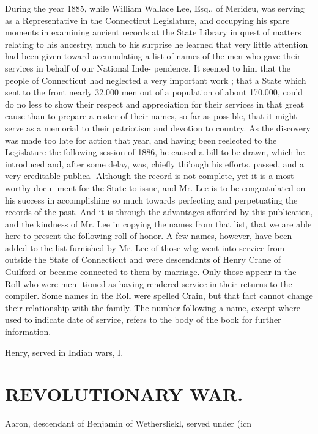 \documentclass[oneside]{book}
\begin{document}
During the year 1885, while William Wallace Lee, Esq., of 
Merideu, was serving as a Representative in the Connecticut 
Legislature, and occupying his spare moments in examining 
ancient records at the State Library in quest of matters relating 
to his ancestry, much to his surprise he learned that very little 
attention had been given toward accumulating a list of names of 
the men who gave their services in behalf of our National Inde- 
pendence. It seemed to him that the people of Connecticut had 
neglected a very important work ; that a State which sent to 
the front nearly 32,000 men out of a population of about 
170,000, could do no less to show their respect and appreciation 
for their services in that great cause than to prepare a roster of 
their names, so far as possible, that it might serve as a memorial 
to their patriotism and devotion to country. As the discovery 
was made too late for action that year, and having been reelected 
to the Legislature the following session of 1886, he caused a bill 
to be drawn, which he introduced and, after some delay, was, 
chiefly thi'ough his efforts, passed, and a very creditable publica- 
Although the record is not complete, yet it is a most worthy docu- 
ment for the State to issue, and Mr. Lee is to be congratulated 
on his success in accomplishing so much towards perfecting and 
perpetuating the records of the past. And it is through the 
advantages afforded by this publication, and the kindness of Mr. 
Lee in copying the names from that list, that we are able here to 
present the following roll of honor. A few names, however, 
have been added to the list furnished by Mr. Lee of those whg 
went into service from outside the State of Connecticut and were 
descendants of Henry Crane of Guilford or became connected to 
them by marriage. Only those appear in the Roll who were men- 
tioned as having rendered service in their returns to the compiler. 
Some names in the Roll were spelled Crain, but that fact cannot 
change their relationship with the family. The number following 
a name, except where used to indicate date of service, refers to 
the body of the book for further information. 

Henry, served in Indian wars, I. 



\section{REVOLUTIONARY WAR.}
Aaron, descendant of Benjamin of Wethersliekl, served under (icn 
\end{document}

